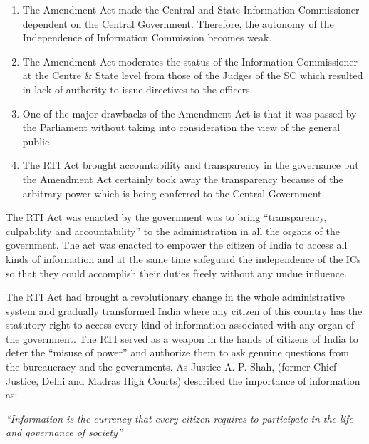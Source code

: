 \begin{multicols}{2}
\begin{enumerate}
\item The Amendment Act made the Central and State Information Commissioner
dependent on the Central Government. Therefore, the autonomy of the Independence
of Information Commission becomes weak.

\item The Amendment Act moderates the status of the Information Commissioner at the
Centre \& State level from those of the Judges of the SC which resulted in lack of
authority to issue directives to the officers.

\item One of the major drawbacks of the Amendment Act is that it was passed by the
Parliament without taking into consideration the view of the general public.

\item The RTI Act brought accountability and transparency in the governance but the
Amendment Act certainly took away the transparency because of the arbitrary power
which is being conferred to the Central Government.
\end{enumerate}


\noi
The RTI Act was enacted by the government was to bring “transparency, culpability and
accountability” to the administration in all the organs of the government. The act was enacted
to empower the citizen of India to access all kinds of information and at the same time
safeguard the independence of the ICs so that they could accomplish their duties freely
without any undue influence.

\noi
The RTI Act had brought a revolutionary change in the whole administrative system and
gradually transformed India where any citizen of this country has the statutory right to access
every kind of information associated with any organ of the government. The RTI served as a
weapon in the hands of citizens of India to deter the “misuse of power” and authorize them to
ask genuine questions from the bureaucracy and the governments. As Justice A. P. Shah,
(former Chief Justice, Delhi and Madras High Courts) described the importance of
information as:

\noi
\begin{quoting}
\textit{“Information is the currency that every citizen requires to participate in the life and
governance of society”}
\end{quoting}


\end{multicols}
